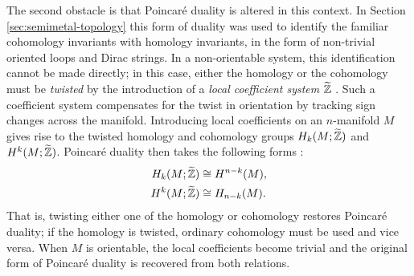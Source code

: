 The second obstacle is that Poincaré duality is altered in this context. In Section \ref{sec:semimetal-topology} this form of duality was used to identify the familiar cohomology invariants with homology invariants, in the form of non-trivial oriented loops and Dirac strings. In a non-orientable system, this identification cannot be made directly; in this case, either the homology or the cohomology must be \emph{twisted} by the introduction of a \emph{local coefficient system} $\widetilde{\mathbb{Z}}$ \cites{Whitehead_Homotopy}{Hatcher_algebraic-topology}. Such a coefficient system compensates for the twist in orientation by tracking sign changes across the manifold. Introducing local coefficients on an $n$-manifold $M$ gives rise to the twisted homology and cohomology groups $H_k(M;\widetilde{\mathbb{Z}})$ and $H^k(M;\widetilde{\mathbb{Z}})$. Poincaré duality then takes the following forms \parencite[Thm. 3H.6]{Hatcher_algebraic-topology}:
\begin{align*}
	H_k(M;\widetilde{\mathbb{Z}}) &\cong H^{n-k}(M), \\
	H^k(M;\widetilde{\mathbb{Z}}) &\cong H_{n-k}(M).
\end{align*}
That is, twisting either one of the homology or cohomology restores Poincaré duality; if the homology is twisted, ordinary cohomology must be used and vice versa. When $M$ is orientable, the local coefficients become trivial and the original form of Poincaré duality is recovered from both relations.

